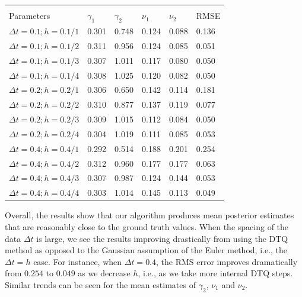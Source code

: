 \documentclass[graybox]{svmult}
\begin{document}
\setlength{\tabcolsep}{12pt}
\begin{table}[!htbp] \centering 
\begin{tabular}{llllll}
\\[-1.8ex]\hline 
\hline \\[-1.8ex]
Parameters & $\gamma_1$ & $\gamma_2$ & $\nu_1$ & $\nu_2$ & RMSE \\ \hline
$\Delta t=0.1; h=0.1/1$  &   0.301  &   0.748 & 0.124 & 0.088 & 0.136 \\ 
$\Delta t=0.1; h=0.1/2$  &   0.311  &   0.956 & 0.124 & 0.085 & 0.051 \\ 
$\Delta t=0.1; h=0.1/3$  &   0.307  &   1.011 & 0.117 & 0.080 & 0.050 \\
$\Delta t=0.1; h=0.1/4$  &   0.308  &   1.025 & 0.120 & 0.082 & 0.050 \\ \hline
$\Delta t=0.2; h=0.2/1$  &   0.306  &   0.650 & 0.142 & 0.114 & 0.181 \\
$\Delta t=0.2; h=0.2/2$  &   0.310  &   0.877 & 0.137 & 0.119 & 0.077 \\
$\Delta t=0.2; h=0.2/3$  &   0.309  &   1.015 & 0.112 & 0.084 & 0.050 \\
$\Delta t=0.2; h=0.2/4$  &   0.304  &   1.019 & 0.111 & 0.085 & 0.053 \\ \hline
$\Delta t=0.4; h=0.4/1$  &   0.292  &   0.514 & 0.188 & 0.201 & 0.254 \\ 
$\Delta t=0.4; h=0.4/2$  &   0.312  &   0.960 & 0.177 & 0.177 & 0.063 \\
$\Delta t=0.4; h=0.4/3$  &   0.307  &   0.987 & 0.124 & 0.144 & 0.053 \\
$\Delta t=0.4; h=0.4/4$  &   0.303  &   1.014 & 0.145 & 0.113 & 0.049
\end{tabular}
\end{table} 

Overall, the results show that our algorithm produces mean posterior
estimates that are reasonably close to the ground truth values. When
the spacing of the data $\Delta t$ is large, we see the results improving drastically from using the DTQ method as opposed to the Gaussian assumption of the Euler method, i.e., the $\Delta t = h$ case. For instance, when $\Delta t = 0.4$, the
RMS error improves dramatically from $0.254$ to
$0.049$ as we decrease $h$, i.e., as we take more internal DTQ steps.
Similar trends can be seen for the mean estimates of $\gamma_2$, $\nu_1$ and $\nu_2$.
\end{document}
